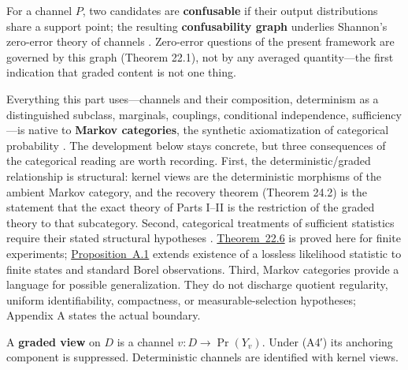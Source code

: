 
For a channel \(P\), two candidates are \textbf{confusable} if their output distributions share a support point; the resulting \textbf{confusability graph} underlies Shannon's zero-error theory of channels \autocite{shannon1956}. Zero-error questions of the present framework are governed by this graph (Theorem 22.1), not by any averaged quantity---\hspace{0pt}the first indication that graded content is not one thing.


Everything this part uses---\hspace{0pt}channels and their composition, determinism as a distinguished subclass, marginals, couplings, conditional independence, sufficiency---\hspace{0pt}is native to \textbf{Markov categories}, the synthetic axiomatization of categorical probability \autocite{cho2019,fritz2020}. The development below stays concrete, but three consequences of the categorical reading are worth recording. First, the deterministic/graded relationship is structural: kernel views are the deterministic morphisms of the ambient Markov category, and the recovery theorem (Theorem 24.2) is the statement that the exact theory of Parts I--II is the restriction of the graded theory to that subcategory. Second, categorical treatments of sufficient statistics require their stated structural hypotheses \autocite{fritz2020}. \hyperlink{stmt:22.6}{Theorem~22.6} is proved here for finite experiments; \hyperlink{stmt:A.1}{Proposition~A.1} extends existence of a lossless likelihood statistic to finite states and standard Borel observations. Third, Markov categories provide a language for possible generalization. They do not discharge quotient regularity, uniform identifiability, compactness, or measurable-selection hypotheses; Appendix A states the actual boundary.



\begin{thmdef}

A \textbf{graded view} on \(D\) is a channel \(v : D \to \Pr(Y_v)\). Under (A4′) its anchoring component is suppressed. Deterministic channels are identified with kernel views.
\end{thmdef}

